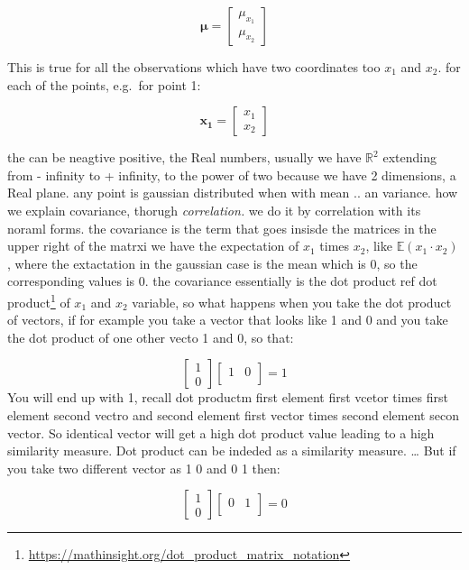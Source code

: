 \documentclass[
  12pt,
  a4paper,
  oneside]{book}
\DeclareRobustCommand{\href}[2]{#2\footnote{\url{#1}}}
\theoremstyle{definition}
\theoremstyle{definition}
\theoremstyle{definition}
\theoremstyle{remark}
\begin{document}
\[
\boldsymbol{\mu}=\left[\begin{array}{ll}
\mu_{x_1} \\
\mu_{x_2}
\end{array}\right]
\]

This is true for all the observations which have two coordinates too \(x_1\) and \(x_2\). for each of the points, e.g.~for point 1:

\[
\mathbf{x_1}=\left[\begin{array}{ll}
x_1 \\
x_2
\end{array}\right]
\]

the can be neagtive positive, the Real numbers, usually we have \(\mathbb{R}^{2}\) extending from - infinity to + infinity, to the power of two because we have 2 dimensions, a Real plane.
any point is gaussian distributed when with mean .. an variance.
how we explain covariance, thorugh \emph{correlation.}
we do it by correlation with its noraml forms. the covariance is the term that goes insisde the matrices in the upper right of the matrxi we have the expectation of \(x_1\) times \(x_2\), like \(\mathbb{E}(x_1 \cdot x_2)\), where the extactation in the gaussian case is the mean which is 0, so the corresponding values is 0.
the covariance essentially is the dot product \href{https://mathinsight.org/dot_product_matrix_notation}{ref dot product} of \(x_1\) and \(x_2\) variable, so what happens when you take the dot product of vectors,
if for example you take a vector that looks like 1 and 0 and you take the dot product of one other vecto 1 and 0, so that:

\[
\left[\begin{array}{ll}
1 \\
0
\end{array}\right]\left[\begin{array}{ll}
1 & 0 \\
\end{array}\right] = 1
\]
You will end up with 1, recall dot productm first element first vcetor times first element second vectro and second element first vector times second element secon vector. So identical vector will get a high dot product value leading to a high similarity measure. Dot product can be indeded as a similarity measure.
\ldots{} But if you take two different vector as 1 0 and 0 1 then:

\[
\left[\begin{array}{ll}
1 \\
0
\end{array}\right]\left[\begin{array}{ll}
0 & 1 \\
\end{array}\right] = 0
\]
\end{document}
